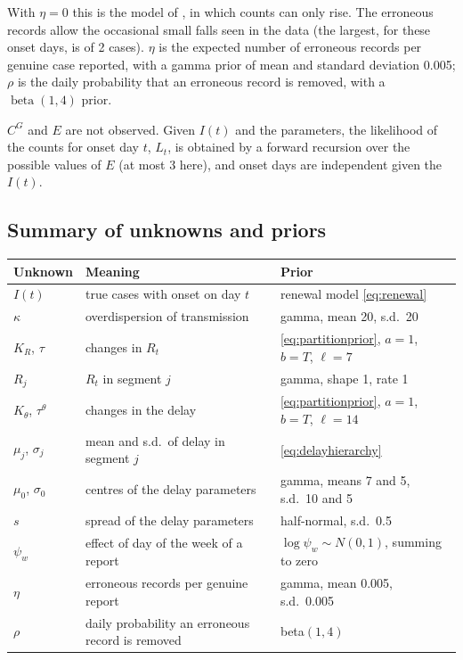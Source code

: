 \documentclass[11pt,a4paper]{article}
\begin{document}
With $\eta=0$ this is the model of \cite{bajaj2025}, in which counts can only
rise. The erroneous records allow the occasional small falls seen in the data
(the largest, for these onset days, is of 2 cases). $\eta$ is the expected
number of erroneous records per genuine case reported, with a gamma prior of
mean and standard deviation 0.005; $\rho$ is the daily probability that an
erroneous record is removed, with a $\operatorname{beta}(1,4)$ prior.

$C^{G}$ and $E$ are not observed. Given $I(t)$ and the parameters, the likelihood
of the counts for onset day $t$, $L_t$, is obtained by a forward recursion
over the possible values of $E$ (at most 3 here), and onset days are
independent given the $I(t)$.

\subsection{Summary of unknowns and priors}

\begin{center}
\begin{tabular}{lll}
\toprule
Unknown & Meaning & Prior \\
\midrule
$I(t)$ & true cases with onset on day $t$ & renewal model \eqref{eq:renewal} \\
$\kappa$ & overdispersion of transmission & gamma, mean 20, s.d.\ 20 \\
$K_R$, $\tau$ & changes in $R_t$ & \eqref{eq:partitionprior}, $a=1$, $b=T$, $\ell=7$ \\
$R_j$ & $R_t$ in segment $j$ & gamma, shape 1, rate 1 \\
$K_\theta$, $\tau^\theta$ & changes in the delay & \eqref{eq:partitionprior}, $a=1$, $b=T$, $\ell=14$ \\
$\mu_j$, $\sigma_j$ & mean and s.d.\ of delay in segment $j$ & \eqref{eq:delayhierarchy} \\
$\mu_0$, $\sigma_0$ & centres of the delay parameters & gamma, means 7 and 5, s.d.\ 10 and 5 \\
$s$ & spread of the delay parameters & half-normal, s.d.\ 0.5 \\
$\psi_w$ & effect of day of the week of a report & $\log\psi_w\sim N(0,1)$, summing to zero \\
$\eta$ & erroneous records per genuine report & gamma, mean 0.005, s.d.\ 0.005 \\
$\rho$ & daily probability an erroneous record is removed & beta$(1,4)$ \\
\bottomrule
\end{tabular}
\end{center}
\end{document}
